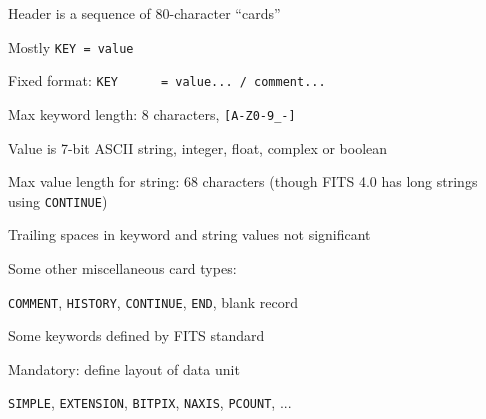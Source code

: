 \documentclass[20pt,landscape]{foils}
\begin{document}
\begin{list0}
\vspace*{-0.15cm}
  \item Header is a sequence of 80-character ``cards''
\vspace*{-0.15cm}
  \begin{list2big}
    \item Mostly {\color{brown}\tt KEY = value}
    \begin{list3}
      \item Fixed format:
            {\color{brown}\verb*|KEY      = value... / comment...|}
      \item Max keyword length: 8 characters,
            {\color{brown}\verb|[A-Z0-9_-]|}
      \item Value is 7-bit ASCII string, integer, float, complex or boolean
      \item Max value length for string: 68 characters
            (though FITS 4.0 has long strings using {\color{brown}\tt CONTINUE})
      \item Trailing spaces in keyword and string values not significant
\vspace*{-0.15cm}
    \end{list3}
\vspace*{-0.15cm}
    \item Some other miscellaneous card types:
\vspace*{-0.15cm}
    \begin{list3}
      \item {\color{brown}\tt COMMENT},
            {\color{brown}\tt HISTORY},
            {\color{brown}\tt CONTINUE},
            {\color{brown}\tt END},
            blank record
\vspace*{-0.15cm}
    \end{list3}
\vspace*{-0.15cm}
    \item Some keywords defined by FITS standard
\vspace*{-0.1cm}
    \begin{list3}
      \item Mandatory: define layout of data unit
      \begin{list4}
        \item[] {\color{brown}\tt SIMPLE},
                {\color{brown}\tt EXTENSION},
                {\color{brown}\tt BITPIX},
                {\color{brown}\tt NAXIS},
                {\color{brown}\tt PCOUNT},
                ...
\vspace*{-0.15cm}
      \end{list4}

\end{list3}
\end{list2big}
\end{list0}
\end{document}

